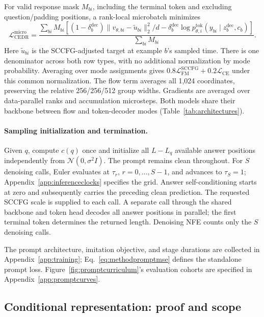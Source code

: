 \documentclass[11pt,letterpaper]{article}
\begin{document}
For valid response mask $M_{bi}$, including the terminal token and excluding question/padding positions, a rank-local microbatch minimizes
\begin{equation}
 \mathcal L_{\mathrm{CEDR}}^{\mathrm{micro}}=
 \frac{\sum_{bi}M_{bi}\left[
 (1-\delta_b^{\mathrm{dec}})\|v_{\theta,bi}-\widetilde u_{bi}\|_2^2/d
 -\delta_b^{\mathrm{dec}}\log p_{\theta,i}^{\mathrm{tok}}(y_{bi}\mid z_b^{\mathrm{dec}},c_b)\right]}
 {\sum_{bi}M_{bi}}.
 \label{eq:methodmicroobjective}
\end{equation}
Here $\widetilde u_{bi}$ is the SCCFG-adjusted target at example $b$'s sampled time. There is one denominator across both row types, with no additional normalization by mode probability. Averaging over mode assignments gives $0.8\mathcal L_{\mathrm{FM}}^{\mathrm{SCCFG}}+0.2\mathcal L_{\mathrm{CE}}$ under this common normalization. The flow term averages all 1,024 coordinates, preserving the relative 256/256/512 group widths. Gradients are averaged over data-parallel ranks and accumulation microsteps. Both models share their backbone between flow and token-decoder modes (Table~\ref{tab:architectures}).

\paragraph{Sampling initialization and termination.}
Given $q$, compute $c(q)$ once and initialize all $L-L_q$ available answer positions independently from $\mathcal N(0,\sigma^2I)$. The prompt remains clean throughout. For $S$ denoising calls, Euler evaluates at $\tau_r$, $r=0,\ldots,S-1$, and advances to $\tau_S=1$; Appendix~\ref{app:inferenceclocks} specifies the grid. Answer self-conditioning starts at zero and subsequently carries the preceding clean prediction. The requested SCCFG scale is supplied to each call. A separate call through the shared backbone and token head decodes all answer positions in parallel; the first terminal token determines the returned length. Denoising NFE counts only the $S$ denoising calls.

The prompt architecture, imitation objective, and stage durations are collected in Appendix~\ref{app:training}; Eq.~\eqref{eq:methodpromptmse} defines the standalone prompt loss. Figure~\ref{fig:promptcurriculum}'s evaluation cohorts are specified in Appendix~\ref{app:promptcurves}.

\subsection{Conditional representation: proof and scope}
\label{app:conditioninglemma}
\end{document}
